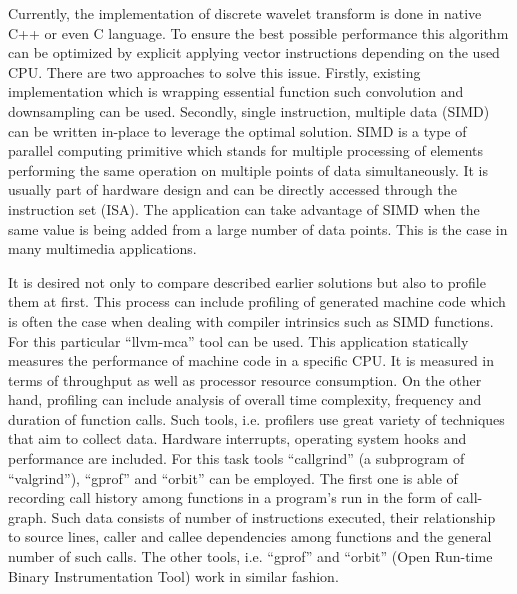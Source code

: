 Currently, the implementation of discrete wavelet transform is done in native C++ or even C language. To ensure
the best possible performance this algorithm can be optimized by explicit applying vector instructions depending
on the used CPU. There are two approaches to solve this issue. Firstly, existing implementation which is wrapping
essential function such convolution and downsampling can be used. Secondly, single instruction, multiple data (SIMD)
can be written in-place to leverage the optimal solution. SIMD is a type of parallel computing primitive which stands
for multiple processing of elements performing the same operation on multiple points of data simultaneously. It is
usually part of hardware design and can be directly accessed through the instruction set (ISA). The application can
take advantage of SIMD when the same value is being added from a large number of data points. This is the case
in many multimedia applications.

It is desired not only to compare described earlier solutions but also to profile them at first. This process can
include profiling of generated machine code which is often the case when dealing with compiler intrinsics such as
SIMD functions. For this particular ``llvm-mca'' tool can be used. This application statically measures the performance
of machine code in a specific CPU. It is measured in terms of throughput as well as processor resource consumption.
On the other hand, profiling can include analysis of overall time complexity, frequency and duration of function calls.
Such tools, i.e. profilers use great variety of techniques that aim to collect data. Hardware interrupts, operating
system hooks and performance are included. For this task tools ``callgrind'' (a subprogram of ``valgrind''), ``gprof''
and ``orbit'' can be employed. The first one is able of recording call history among functions in a program's run in
the form of call-graph. Such data consists of number of instructions executed, their relationship to source lines,
caller and callee dependencies among functions and the general number of such calls. The other tools, i.e. ``gprof''
and ``orbit'' (Open Run-time Binary Instrumentation Tool) work in similar fashion.
